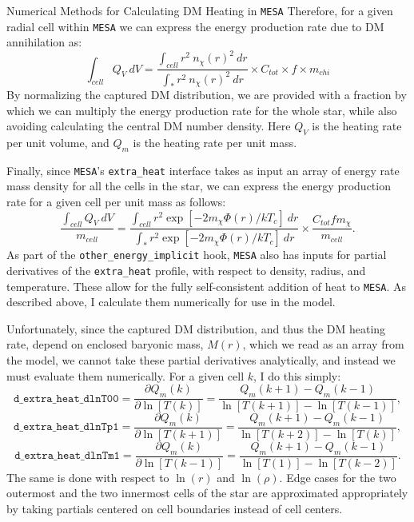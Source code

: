 \documentclass[a4paper,11pt]{article}
\begin{document}
\begin{section}{Numerical Methods for Calculating DM Heating in \texttt{MESA}}
    Therefore, for a given radial cell within \texttt{MESA} we can express the energy production rate due to DM annihilation as: 
    \begin{equation}
        \int_{cell} Q_{V} ~ dV = \frac{\int_{cell} r^2 ~n_{\chi}(r)^2~ dr}{\int_* r^2~ n_{\chi}(r)^2 ~dr} \times C_{tot} \times f \times m_{chi}
        \label{qm}
    \end{equation}
    By normalizing the captured DM distribution, we are provided with a fraction by which we can multiply the energy production rate for the whole star, while also avoiding calculating the central DM number density.
    Here $Q_V$ is the heating rate per unit volume, and $Q_m$ is the heating rate per unit mass.

    Finally, since \texttt{MESA}'s \texttt{extra\_heat} interface takes as input an array of energy rate mass density for all the cells in the star, we can express the energy production rate for a given cell per unit mass as follows: 
    \begin{equation}
        \frac{\int_{cell} Q_{V} ~ dV}{m_{cell}}  = \frac{\int_{cell} r^2 \exp[-2m_{\chi} \Phi(r) / kT_c]~dr}{\int_{*} r^2 \exp[-2m_{\chi} \Phi(r) / kT_c]~dr} \times \frac{C_{tot} f m_{\chi}}{m_{cell}}.
        \label{Qmpercell}
    \end{equation}
    As part of the \texttt{other\_energy\_implicit} hook, \texttt{MESA} also has inputs for partial derivatives of the \texttt{extra\_heat} profile, with respect to density, radius, and temperature. These allow for the fully self-consistent addition of heat to \texttt{MESA}.
    As described above, I calculate them numerically for use in the model.

    Unfortunately, since the captured DM distribution, and thus the DM heating rate, depend on enclosed baryonic mass, $M(r)$, which we read as an array from the model, we cannot take these partial derivatives analytically, and instead we must evaluate them numerically. 
    For a given cell $k$, I do this simply:
    \begin{equation}
        \texttt{d\_extra\_heat\_dlnT00} = \frac{\partial Q_{m}(k)}{\partial \ln[T(k)]} =
        \frac{Q_{m}(k+1) - Q_{m}(k-1)}{\ln[T(k+1)] - \ln[T(k-1)]} ,
    \end{equation}
    \begin{equation}
        \texttt{d\_extra\_heat\_dlnTp1} = \frac{\partial Q_{m}(k)}{\partial \ln[T(k+1)]} =
        \frac{Q_{m}(k+1) - Q_{m}(k-1)}{\ln[T(k+2)] - \ln[T(k)]} ,
    \end{equation}
    \begin{equation}
        \texttt{d\_extra\_heat\_dlnTm1} = \frac{\partial Q_{m}(k)}{\partial \ln[T(k-1)]} =
        \frac{Q_{m}(k+1) - Q_{m}(k-1)}{\ln[T(1)] - \ln[T(k-2)]}.
    \end{equation}
    The same is done with respect to $\ln(r)$ and $\ln(\rho)$.
    Edge cases for the two outermost and the two innermost cells of the star are approximated appropriately by taking partials centered on cell boundaries instead of cell centers.


\end{section}
\end{document}
